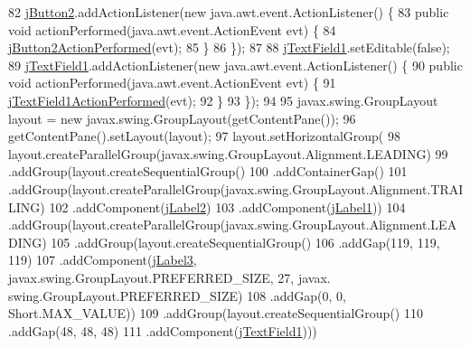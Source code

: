 \begin{DoxyCode}
82         \mbox{\hyperlink{class_ejercicio2_1_1_buffer_interfaz_a0c2d3a8ae39447836ea6faf16fb98ec3}{jButton2}}.addActionListener(\textcolor{keyword}{new} java.awt.event.ActionListener() \{
83             \textcolor{keyword}{public} \textcolor{keywordtype}{void} actionPerformed(java.awt.event.ActionEvent evt) \{
84                 \mbox{\hyperlink{class_ejercicio2_1_1_buffer_interfaz_af46612a912867d6c9824fbf28628ba1f}{jButton2ActionPerformed}}(evt);
85             \}
86         \});
87 
88         \mbox{\hyperlink{class_ejercicio2_1_1_buffer_interfaz_a2cfe0e22bb31e597087955036f69b34a}{jTextField1}}.setEditable(\textcolor{keyword}{false});
89         \mbox{\hyperlink{class_ejercicio2_1_1_buffer_interfaz_a2cfe0e22bb31e597087955036f69b34a}{jTextField1}}.addActionListener(\textcolor{keyword}{new} java.awt.event.ActionListener() \{
90             \textcolor{keyword}{public} \textcolor{keywordtype}{void} actionPerformed(java.awt.event.ActionEvent evt) \{
91                 \mbox{\hyperlink{class_ejercicio2_1_1_buffer_interfaz_aeb77802d30bd769d914d0cd86698582e}{jTextField1ActionPerformed}}(evt);
92             \}
93         \});
94 
95         javax.swing.GroupLayout layout = \textcolor{keyword}{new} javax.swing.GroupLayout(getContentPane());
96         getContentPane().setLayout(layout);
97         layout.setHorizontalGroup(
98             layout.createParallelGroup(javax.swing.GroupLayout.Alignment.LEADING)
99             .addGroup(layout.createSequentialGroup()
100                 .addContainerGap()
101                 .addGroup(layout.createParallelGroup(javax.swing.GroupLayout.Alignment.TRAILING)
102                     .addComponent(\mbox{\hyperlink{class_ejercicio2_1_1_buffer_interfaz_ac8adb3eda942e75c690374fafc43eee2}{jLabel2}})
103                     .addComponent(\mbox{\hyperlink{class_ejercicio2_1_1_buffer_interfaz_adc7aca7314d0fe3c8cbe793a812d21b2}{jLabel1}}))
104                 .addGroup(layout.createParallelGroup(javax.swing.GroupLayout.Alignment.LEADING)
105                     .addGroup(layout.createSequentialGroup()
106                         .addGap(119, 119, 119)
107                         .addComponent(\mbox{\hyperlink{class_ejercicio2_1_1_buffer_interfaz_ab11594779db262d4fc72c8c1515b7fd9}{jLabel3}}, javax.swing.GroupLayout.PREFERRED\_SIZE, 27, javax.
      swing.GroupLayout.PREFERRED\_SIZE)
108                         .addGap(0, 0, Short.MAX\_VALUE))
109                     .addGroup(layout.createSequentialGroup()
110                         .addGap(48, 48, 48)
111                         .addComponent(\mbox{\hyperlink{class_ejercicio2_1_1_buffer_interfaz_a2cfe0e22bb31e597087955036f69b34a}{jTextField1}})))

\end{DoxyCode}
